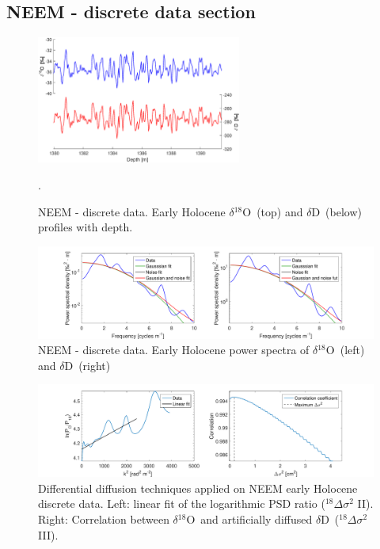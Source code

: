 \documentclass[11pt, draftcls, onecolumn]{IEEEtran} %
\numberwithin{equation}{section}
\numberwithin{table}{section}
\numberwithin{figure}{section}
\newcommand{\delOx}{$\delta{}^{18}\mathrm{O}$}
\newcommand{\delD}{$\delta\mathrm{D}$}
\begin{document}
\begin{appendices}
\subsection{NEEM - discrete data section}

\begin{figure}[H]
	\vspace*{2mm}
	\begin{center}
		\includegraphics[width=0.6\textwidth]{NEEM_disc_holo}
		\caption{NEEM - discrete data. Early Holocene \delOx~(top) and \delD~(below) profiles with depth.}  \label{fig:NEEM_disc_holo}.
	\end{center}
\end{figure}


\begin{figure}[H]
	\vspace*{2mm}
	\begin{center}
		\includegraphics[width=1\textwidth]{Figure_27}
		\caption{NEEM - discrete data. Early Holocene power spectra of \delOx~(left) and \delD~(right)}  \label{fig:NEEM_dis_fig_1}
	\end{center}
\end{figure}

\begin{figure}[H]
	\vspace*{2mm}
	\begin{center}
		\includegraphics[width=1\textwidth]{Figure_28}
		\caption{Differential diffusion techniques applied on NEEM early Holocene discrete data. 
			Left: linear fit of the logarithmic PSD ratio ($^{18}\Delta\sigma^2$ II). Right: 
			Correlation between \delOx~and artificially diffused \delD~($^{18}\Delta\sigma^2$ III).}  \label{fig:NEEM_dis_fig_2}
	\end{center}
\end{figure}


\end{appendices}
\end{document}

